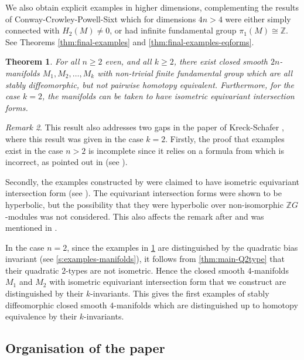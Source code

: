 \documentclass[11pt,a4paper,leqno]{amsart}
\newtheorem{theorem}{Theorem}[section]
\theoremstyle{definition}
\theoremstyle{remark}
\newtheorem{remark}[theorem]{Remark}
\newcommand{\Z}{\mathbb{Z}}
\begin{document}
We also obtain explicit examples in higher dimensions, complementing the results of Conway-Crowley-Powell-Sixt \cite{CCPS22,CCPS23} which for dimensions $4n >4$ were either simply connected with $H_2(M) \neq 0$, or had infinite fundamental group $\pi_1(M) \cong \Z$.
See Theorems \ref{thm:final-examples} and \ref{thm:final-examples-eqforms}.

\begin{theorem} \label{thm:main-higher-dim}
For all $n \geq 2$ even, and all $k \geq 2$, there exist closed smooth $2n$-manifolds $M_1, M_2, \dots, M_k$  with non-trivial finite fundamental group which are all stably diffeomorphic, but not pairwise homotopy equivalent.
Furthermore, for the case $k=2$, the manifolds can be taken to have isometric equivariant intersection forms. \end{theorem}

\begin{remark}\label{rem:KSgap}
This result also addresses two gaps in the paper of Kreck-Schafer \cite{Kreck:1984}, where this result was given in the case $k=2$. Firstly, the proof that examples exist in the case $n >2$ is incomplete since it relies on a formula from \cite[Proposition 8]{Sieradski:1979} which is incorrect, as pointed out in \cite[p305]{Linnell:1993} (see \cite[p36-38]{Kreck:1984}).

Secondly, the examples constructed by \cite{Kreck:1984} were claimed to have isometric equivariant intersection form (see \cite[p21]{Kreck:1984}). The equivariant intersection forms were shown to be hyperbolic, but the possibility that they were hyperbolic over non-isomorphic $\Z G$-modules was not considered. This also affects the remark after \cite[Theorem 4.1]{Hambleton:1993} and was mentioned in \cite[p2]{CCPS22}.
\end{remark}

 In the case $n=2$, since the examples in \cref{thm:main-higher-dim} are distinguished by the quadratic bias invariant (see \cref{s:examples-manifolds}), it follows from \cref{thm:main-Q2type} that their quadratic $2$-types are not isometric. Hence the closed smooth $4$-manifolds $M_1$ and $M_2$ with isometric equivariant intersection form that we construct are distinguished by their $k$-invariants. This gives the first examples of stably diffeomorphic closed smooth $4$-manifolds which are distinguished up to homotopy equivalence by their $k$-invariants.

\subsection*{Organisation of the paper} 
\end{document}
